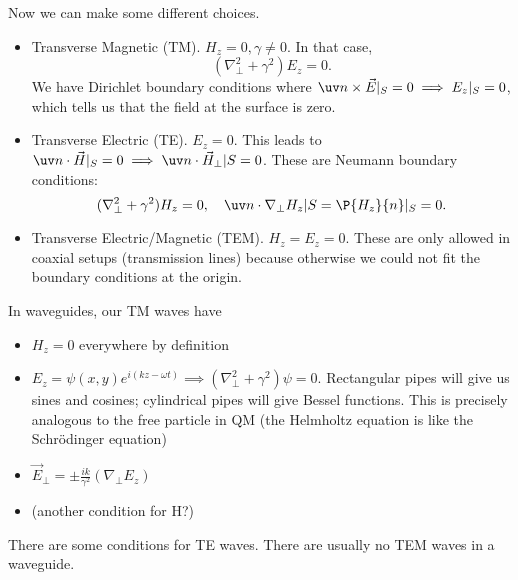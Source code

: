 Now we can make some different choices.
\begin{itemize}
    \item Transverse Magnetic (TM). $H_z=0, \gamma \neq 0$. In that case,
    \begin{equation}
        (\nabla_\perp^2 + \gamma^2) E_z =0.
    \end{equation}
    We have Dirichlet boundary conditions where $\uv n \times \vec E|_S=0\implies E_z|_S=0$, which tells us that the field at the surface is zero.
    \item Transverse Electric (TE). $E_z=0$. This leads to $\uv n \cdot \vec H|_S=0 \implies \uv n \cdot \vec H_\perp|S=0$. These are Neumann boundary conditions:
    \begin{equation}
        (\nabla_\perp^2 + \gamma^2)H_z=0, \quad \uv n \cdot \nabla_\perp H_z|S = \P{H_z}{n}|_S=0.
    \end{equation}
    \item Transverse Electric/Magnetic (TEM). $H_z=E_z=0$. These are only allowed in coaxial setups (transmission lines) because otherwise we could not fit the boundary conditions at the origin.
\end{itemize}

In waveguides, our TM waves have
\begin{itemize}
    \item $H_z=0$ everywhere by definition
    \item $E_z= \psi(x,y) e^{i(kz-\omega t)} \implies (\nabla_\perp^2 + \gamma^2 )\psi=0$. Rectangular pipes will give us sines and cosines; cylindrical pipes will give Bessel functions. This is precisely analogous to the free particle in QM (the Helmholtz equation is like the Schr\"odinger equation)
    \item $\vec E_\perp = \pm\frac{ik}{\gamma^2}(\nabla_\perp E_z)$
    \item (another condition for H?)
\end{itemize}

There are some conditions for TE waves. There are usually no TEM waves in a waveguide.